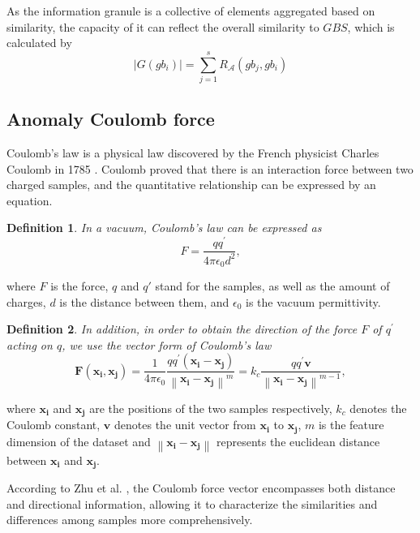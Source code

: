 \documentclass[times, review, 10pt]{elsarticle}
\newtheorem{definition}{Definition}
\begin{document}
{
As the information granule is a collective of elements aggregated based on similarity, the capacity of it can reflect the overall similarity to $GBS$, which is calculated by
\begin{equation}
    |G(gb_{i})| = \sum_{j=1}^{s} R_{\mathcal{A}}(gb_{j},gb_{i})
\end{equation}
}

\subsection{Anomaly Coulomb force}
\label{Anomaly Coulomb force}


Coulomb's law is a physical law discovered by the French physicist Charles Coulomb in 1785 \cite{zhu2022high}. Coulomb proved that there is an interaction force between two charged samples, and the quantitative relationship can be expressed by an equation. 
\begin{definition}
In a vacuum, Coulomb's law can be expressed as
\begin{equation}
F=\frac{q q^{\prime}}{4 \pi \epsilon_0 d^2},
\end{equation}
\end{definition}
where $F$ is the force, $q$ and $q'$ stand for the samples, as well as the amount of charges, $d$ is the distance between them, and $\epsilon_0$ is the vacuum permittivity. 
\begin{definition}
In addition, in order to obtain the direction of the force $F$ of $q^{\prime}$ acting on $q$, we use the vector form of Coulomb's law
\begin{equation}
\label{columb formulation}
{\boldsymbol{F}(\boldsymbol{x_{i}},\boldsymbol{x_{j}})}=\frac{1}{4 \pi \epsilon_0} \frac{q q^{\prime}(\boldsymbol{x_{i}}-\boldsymbol{{x_j}})}{\left\|\boldsymbol{x_i}-\boldsymbol{x_j}\right\|^m}=k_c \frac{q q^{\prime}\boldsymbol{v}}{\left\|\boldsymbol{x_i}-\boldsymbol{{x_j}}\right\|^{m-1}},
\end{equation}
\end{definition}
{
where $\boldsymbol{x_i}$ and ${\boldsymbol{x_j}}$ are the positions of the two samples respectively, $k_c$ denotes the Coulomb constant, $\boldsymbol{v}$ denotes the unit vector from $\boldsymbol{{x_i}}$ to $\boldsymbol{x_j}$, $m$ is the feature dimension of the dataset and  $\left\|\boldsymbol{x_i}-\boldsymbol{{x_j}}\right\|$ represents the euclidean distance between $\boldsymbol{x_i}$ and $\boldsymbol{{x_j}}$.}


According to Zhu et al. \cite{zhu2022high}, the Coulomb force vector encompasses both distance and directional information, allowing it to characterize the similarities and differences among samples more comprehensively. 
\end{document}
